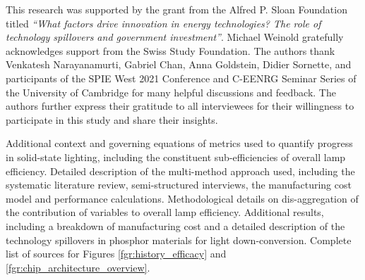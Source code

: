 \documentclass[journal=jacsat,manuscript=article]{achemso}
\begin{document}
\begin{acknowledgement}

This research was supported by the grant from the Alfred P. Sloan Foundation titled \textit{“What factors drive innovation in energy technologies? The role of technology spillovers and government investment”}. Michael Weinold gratefully acknowledges support from the Swiss Study Foundation. The authors thank Venkatesh Narayanamurti, Gabriel Chan, Anna Goldstein, Didier Sornette, and participants of the SPIE West 2021 Conference and C-EENRG Seminar Series of the University of Cambridge for many helpful discussions and feedback. The authors further express their gratitude to all interviewees for their willingness to participate in this study and share their insights. 

\end{acknowledgement}

\begin{suppinfo}

Additional context and governing equations of metrics used to quantify progress in solid-state lighting, including the constituent sub-efficiencies of overall lamp efficiency. Detailed description of the multi-method approach used, including the systematic literature review, semi-structured interviews, the manufacturing cost model and performance calculations. Methodological details on dis-aggregation of the contribution of variables to overall lamp efficiency. Additional results, including a breakdown of manufacturing cost and a detailed description of the technology spillovers in phosphor materials for light down-conversion. Complete list of sources for Figures \ref{fgr:history_efficacy} and \ref{fgr:chip_architecture_overview}.

\end{suppinfo}


\end{document}
